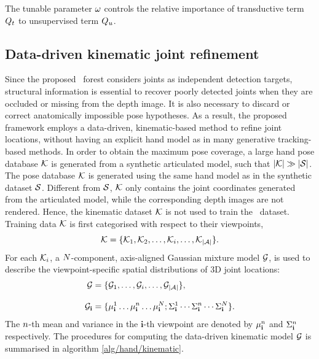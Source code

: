 The tunable parameter $\omega$ controls the relative importance of transductive term $Q_{t}$ to unsupervised term $Q_{u}$.  

\subsection{Data-driven kinematic joint refinement}

Since the proposed \STR\ forest considers joints as independent detection targets, structural information is essential to recover poorly detected joints when they are occluded or missing from the depth image. 
It is also necessary to discard or correct anatomically impossible pose hypotheses.    
As a result, the proposed framework employs a data-driven, kinematic-based method to refine joint locations, without having an explicit hand model as in many generative tracking-based methods. 
In order to obtain the maximum pose coverage, a large hand pose database $\mathcal{K}$ is generated from a synthetic articulated model, such that $|\mathcal{K}| \gg |\mathcal{S}|$. 
The pose database $\mathcal{K}$ is generated using the same hand model as in the synthetic dataset $\mathcal{S}$. Different from $\mathcal{S}$, $\mathcal{K}$ only contains the joint coordinates generated from the articulated model, while the corresponding depth images are not rendered. 
Hence, the kinematic dataset $\mathcal{K}$ is not used to train the \STR\ dataset. 
Training data $\mathcal{K}$ is first categorised with respect to their viewpoints,  
\begin{equation}
	\label{eqn/hand/datadrivenclassify} 
	\mathcal{K} = \{ \mathcal{K}_{1}, \mathcal{K}_{2}, \dots,  \mathcal{K}_{i}, \dots, \mathcal{K}_{|\mathcal{A}|}\}.
\end{equation}
For each $\mathcal{K}_{i}$, a $N$-component, axis-aligned Gaussian mixture model $\mathcal{G}$, is used to describe the viewpoint-specific spatial distributions of 3D joint locations:
\begin{equation}
	\begin{aligned}
		\mathcal{G} & = \{ \mathcal{G}_{1}, \dots, \mathcal{G}_{i}, \dots, \mathcal{G}_{|\mathcal{A}|} \}, \\[3mm] 
		\mathcal{G}_{\mathbf{i}} & = \{\mu_{\mathbf{i}}^{1}\dots\mu_{\mathbf{i}}^{n}\dots\mu_{\mathbf{i}}^{N};\Sigma_{\mathbf{i}}^{1}\cdots\Sigma_{\mathbf{i}}^{n}\cdots\Sigma_{\mathbf{i}}^{N}\}.
	\end{aligned}
\end{equation}
The $n$-th mean and variance in the $\mathbf{i}$-th viewpoint are denoted by $\mu_{\mathbf{i}}^{n}$ and $\Sigma_{\mathbf{i}}^{n}$ respectively. The procedures for computing the data-driven kinematic model $\mathcal{G}$ is summarised in algorithm \ref{alg/hand/kinematic}. 

